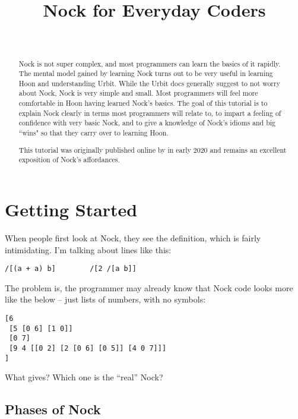 \documentclass[twoside]{article}
\title{Nock for Everyday Coders}
\author{\authorname~\authorpatp \\ \affiliation}
\date{}
\begin{document}
\maketitle
\thispagestyle{firststyle}

\begin{abstract}
  Nock is not super complex, and most programmers can learn the basics of it rapidly. The mental model gained by learning Nock turns out to be very useful in learning Hoon and understanding Urbit.
  While the Urbit docs generally suggest to not worry about Nock, Nock is very simple and small.  Most programmers will feel more comfortable in Hoon having learned Nock's basics.
  The goal of this tutorial is to explain Nock clearly in terms most programmers will relate to, to impart a feeling of confidence with very basic Nock, and to give a knowledge of Nock’s idioms and big ``wins" so that they carry over to learning Hoon.

  \sloppy
  This tutorial was originally published online by  in early 2020 and remains an excellent exposition of Nock's affordances.
\end{abstract}

\setcounter{page}{1}

\tableofcontents

\section{Getting Started}

When people first look at Nock, they see the definition, which is fairly intimidating.  I'm talking about lines like this:

\begin{lstlisting}[style=listingcode]
/[(a + a) b]        /[2 /[a b]]
\end{lstlisting}

The problem is, the programmer may already know that Nock code looks more like the below – just lists of numbers, with no symbols:

\begin{lstlisting}[style=listingcode]
[6
 [5 [0 6] [1 0]]
 [0 7]
 [9 4 [[0 2] [2 [0 6] [0 5]] [4 0 7]]]
]
\end{lstlisting}

What gives? Which one is the ``real'' Nock?

\subsection{Phases of Nock}
\end{document}
